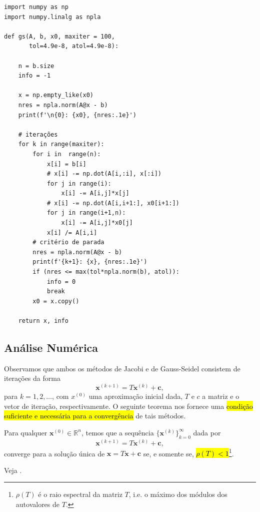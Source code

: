 \begin{ex}
\begin{lstlisting}[caption=gs.py]
import numpy as np
import numpy.linalg as npla

def gs(A, b, x0, maxiter = 100,
       tol=4.9e-8, atol=4.9e-8):
    
    n = b.size
    info = -1

    x = np.empty_like(x0)
    nres = npla.norm(A@x - b)
    print(f'\n{0}: {x0}, {nres:.1e}')
    
    # iterações
    for k in range(maxiter):
        for i in  range(n):
            x[i] = b[i]
            # x[i] -= np.dot(A[i,:i], x[:i])
            for j in range(i):
                x[i] -= A[i,j]*x[j]
            # x[i] -= np.dot(A[i,i+1:], x0[i+1:])
            for j in range(i+1,n):
                x[i] -= A[i,j]*x0[j]
            x[i] /= A[i,i]
        # critério de parada
        nres = npla.norm(A@x - b)
        print(f'{k+1}: {x}, {nres:.1e}')
        if (nres <= max(tol*npla.norm(b), atol)):
            info = 0
            break
        x0 = x.copy()

    return x, info
\end{lstlisting}
\end{ex}

\subsection{Análise Numérica}

Observamos que ambos os métodos de Jacobi e de Gauss-Seidel consistem de iterações da forma
\begin{equation}\label{cap_sislin_sec_jgs:eq:jgs_iter}
  \pmb{x}^{(k+1)} = T\pmb{x}^{(k)} + \pmb{c},
\end{equation}
para $k=1, 2, \ldots$, com $x^{(0)}$ uma aproximação inicial dada, $T$ e $c$ a matriz e o vetor de iteração, respectivamente. O seguinte teorema nos fornece uma \hl{condição suficiente e necessária para a convergência} de tais métodos.

\begin{teo}
  Para qualquer $\pmb{x}^{(0)}\in\mathbb{R}^n$, temos que a sequência $\{\pmb{x}^{(k)}\}_{k=0}^{\infty}$ dada por
  \begin{equation}
    \pmb{x}^{(k+1)} = T\pmb{x}^{(k)} + \pmb{c},
  \end{equation}
  converge para a solução única de $\pmb{x} = T\pmb{x} + \pmb{c}$ se, e somente se, \hl{$\rho(T) < 1$}\footnote{$\rho(T)$ é o raio espectral da matriz $T$, i.e. o máximo dos módulos dos autovalores de $T$.}.
\end{teo}
\begin{dem}
  Veja \cite[Cap. 7, Sec. 7.3]{Burden2016a}.
\end{dem}

